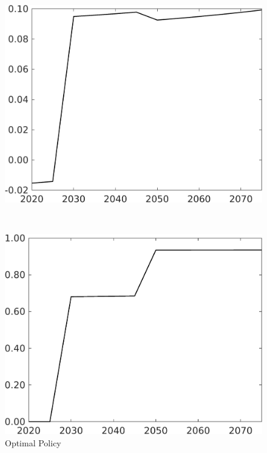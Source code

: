 \begin{figure}[h!!]
	\centering
	\caption{Optimal Policy }\label{fig:optPol}
	\begin{minipage}[]{0.4\textwidth}
		\includegraphics[width=1\textwidth]{../../codding_model/own_basedOnFried/optimalPol_190722_tidiedUp/figures/all_July22/taul_SingleAltPolOPT_T_NoTaus_regime3_spillover0_noskill0_sep1_xgrowth0_etaa0.79.png}
	\end{minipage}
	\begin{minipage}[]{0.1\textwidth}
		\
	\end{minipage}
	\begin{minipage}[]{0.4\textwidth}
		\includegraphics[width=1\textwidth]{../../codding_model/own_basedOnFried/optimalPol_190722_tidiedUp/figures/all_July22/tauf_SingleAltPolOPT_T_NoTaus_regime3_spillover0_noskill0_sep1_xgrowth0_etaa0.79.png}
	\end{minipage}
\end{figure} 


